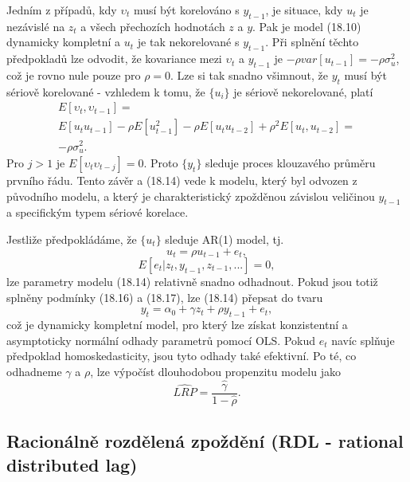 Jedním z případů, kdy $\upsilon_t$ musí být korelováno s $y_{t-1}$, je situace, kdy $u_t$ je nezávislé na $z_t$ a 
všech přechozích hodnotách $z$ a $y$. Pak je model (18.10) 
dynamicky kompletní a $u_t$ je tak nekorelované s 
$y_{t-1}$. Při splnění těchto předpokladů lze odvodit, že 
kovariance mezi $\upsilon_t$ a $y_{t-1}$ je $-\rho var[u_{t-1}] = -\rho 
\sigma_{u}^2$, což je rovno nule pouze pro $\rho = 0$. Lze si tak 
snadno všimnout, že $y_t$ musí být sériově korelované - vzhledem k tomu, že $\{u_i\}$ je 
sériově nekorelované, platí
\begin{multline}
E[\upsilon_t, \upsilon_{t-1}] =\\
E[u_t u_{t-1}] - \rho E[u_{t-1}^2] - \rho E[u_t u_{t-2}] + \rho^2 E[u_t, u_{t-2}] =\\
-\rho \sigma_u^2.
\end{multline}
Pro $j > 1$ je $E[\upsilon_t \upsilon_{t-j}] = 0$. Proto $\{y_t\}$ 
sleduje proces klouzavého průměru prvního řádu. Tento závěr 
a (18.14) vede k modelu, který byl odvozen z původního modelu, a 
který je charakteristický zpožděnou závislou 
veličinou $y_{t-1}$ a specifickým typem sériové korelace.

Jestliže předpokládáme, že $\{u_t\}$ sleduje AR(1) model, tj.
\begin{equation}
u_t = \rho u_{t - 1} + e_t,
\end{equation}
\begin{equation}
E[e_t|z_t, y_{t-1}, z_{t-1}, ...] = 0,
\end{equation}
lze parametry modelu (18.14) relativně snadno odhadnout. Pokud jsou totiž splněny podmínky (18.16) a (18.17), lze (18.14) přepsat do tvaru
\begin{equation}
y_t = \alpha_0 + \gamma z_t + \rho y_{t-1} + e_t,
\end{equation}
což je dynamicky kompletní model, pro který lze získat konzistentní a asymptoticky normální odhady 
parametrů pomocí OLS. Pokud $e_t$ navíc splňuje předpoklad homoskedasticity, jsou tyto odhady také efektivní. Po té, 
co odhadneme $\gamma$ a $\rho$, lze výpočíst dlouhodobou propenzitu modelu jako
\begin{equation}
\hat{LRP} = \frac{\hat{\gamma}}{1 - \hat{\rho}}.
\end{equation}

\subsection{Racionálně rozdělená zpoždění (RDL - rational distributed lag)}

